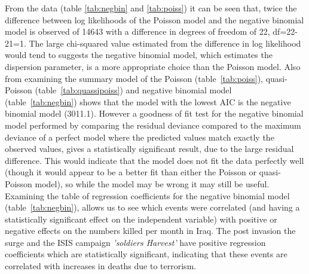 From the data (table \ref{tab:negbin} and \ref{tab:poiss}) it can be seen that, twice the difference between log likelihoods of the Poisson model and the negative binomial model is observed of 14643 with a difference in degrees of freedom of 22, df=22-21=1. The large chi-squared value estimated from the difference in log likelihood would tend to suggests the negative binomial model, which estimates the dispersion parameter, is a more appropriate choice than the Poisson model. Also from examining the summary model of the Poisson (table~\ref{tab:poiss}), quasi-Poisson (table~\ref{tab:quassipoiss}) and negative binomial model (table~\ref{tab:negbin}) shows that the model with the lowest AIC is the negative binomial model (3011.1). However a goodness of fit test for the negative binomial model performed by comparing the residual deviance compared to the maximum deviance of a perfect model where the predicted values match exactly the observed values, gives a statistically significant result, due to the large residual difference. This would indicate that the model does not fit the data perfectly well (though it would appear to be a better fit than either the Poisson or quasi-Poisson model), so while the model may be wrong it may still be useful. Examining the table of regression coefficients for the negative binomial model (table~\ref{tab:negbin}), allows us to see which events were correlated (and having a statistically significant effect on the independent variable) with positive or negative effects on the numbers killed per month in Iraq. The post invasion the surge and the ISIS campaign \textit{'soldiers Harvest'} have positive regression coefficients which are statistically significant, indicating that these events are correlated with increases in deaths due to terrorism.  

